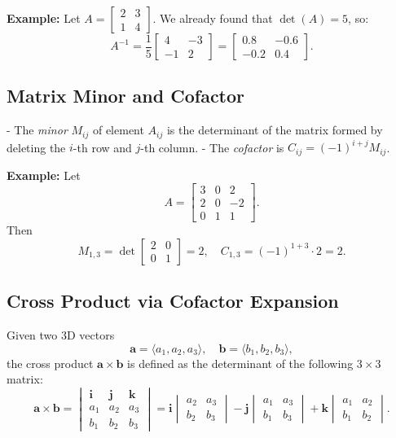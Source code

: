\documentclass{article}
\begin{document}
\begin{multicols}{2}
\textbf{Example:} Let $A=\begin{bmatrix}2 & 3\\1 & 4\end{bmatrix}$. We already found that $\det(A)=5$, so:
\[
A^{-1} = \frac{1}{5}\begin{bmatrix}4 & -3\\-1 & 2\end{bmatrix}
= \begin{bmatrix}0.8 & -0.6\\-0.2 & 0.4\end{bmatrix}.
\]

\subsection*{Matrix Minor and Cofactor}
- The \emph{minor} $M_{ij}$ of element $A_{ij}$ is the determinant of the matrix formed by deleting the $i$-th row and $j$-th column.
- The \emph{cofactor} is $C_{ij}=(-1)^{i+j}M_{ij}$.

\textbf{Example:} Let
\[
A = \begin{bmatrix}3 & 0 & 2\\2 & 0 & -2\\0 & 1 & 1\end{bmatrix}.
\]
Then
\[
M_{1,3} = \det\!\begin{bmatrix}2 & 0\\0 & 1\end{bmatrix} = 2,
\quad
C_{1,3} = (-1)^{1+3}\cdot2 = 2.
\]

\subsection*{Cross Product via Cofactor Expansion}
Given two 3D vectors
\[
\mathbf{a} = \langle a_1, a_2, a_3 \rangle, \quad
\mathbf{b} = \langle b_1, b_2, b_3 \rangle,
\]
the cross product $\mathbf{a} \times \mathbf{b}$ is defined as the determinant of the following $3\times3$ matrix:
\[
\mathbf{a} \times \mathbf{b} =
\begin{vmatrix}
\mathbf{i} & \mathbf{j} & \mathbf{k} \\
a_1 & a_2 & a_3 \\
b_1 & b_2 & b_3
\end{vmatrix}
= \mathbf{i}
\begin{vmatrix}
a_2 & a_3\\
b_2 & b_3
\end{vmatrix}
- \mathbf{j}
\begin{vmatrix}
a_1 & a_3\\
b_1 & b_3
\end{vmatrix}
+ \mathbf{k}
\begin{vmatrix}
a_1 & a_2\\
b_1 & b_2
\end{vmatrix}.
\]


\end{multicols}
\end{document}
